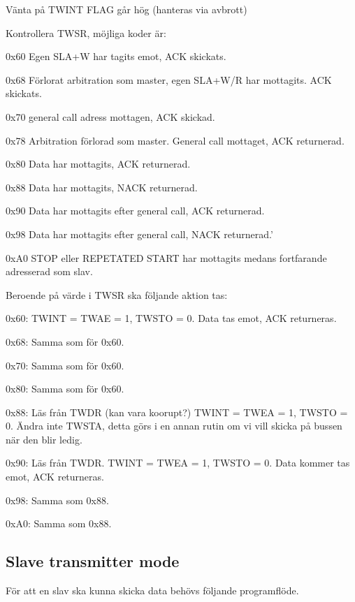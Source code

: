 \begin{packed_enumerate}
\item Vänta på TWINT FLAG går hög (hanteras via avbrott)
\item Kontrollera TWSR, möjliga koder är:
\begin{packed_enumerate}
\item 0x60 Egen SLA+W har tagits emot, ACK skickats.
\item 0x68 Förlorat arbitration som master, egen SLA+W/R har mottagits. ACK skickats.
\item 0x70 general call adress mottagen, ACK skickad.
\item 0x78 Arbitration förlorad som master. General call mottaget, ACK returnerad.
\item 0x80 Data har mottagits, ACK returnerad.
\item 0x88 Data har mottagits, NACK returnerad.
\item 0x90 Data har mottagits efter general call, ACK returnerad.
\item 0x98 Data har mottagits efter general call, NACK returnerad.’
\item 0xA0 STOP eller REPETATED START har mottagits medans fortfarande adresserad som slav.
\end{packed_enumerate}
\item Beroende på värde i TWSR ska följande aktion tas:
\begin{packed_enumerate}
\item 0x60: TWINT = TWAE = 1, TWSTO = 0. Data tas emot, ACK returneras.
\item 0x68: Samma som för 0x60.
\item 0x70: Samma som för 0x60.
\item 0x80: Samma som för 0x60.
\item 0x88: Läs från TWDR (kan vara koorupt?) TWINT = TWEA = 1, TWSTO = 0. Ändra inte TWSTA, detta görs i en annan rutin om vi vill skicka på bussen när den blir ledig.
\item 0x90: Läs från TWDR. TWINT = TWEA = 1, TWSTO = 0. Data kommer tas emot, ACK returneras.
\item 0x98: Samma som 0x88.
\item 0xA0: Samma som 0x88.
\end{packed_enumerate}
\end{packed_enumerate}

\subsection{Slave transmitter mode}
För att en slav ska kunna skicka data behövs följande programflöde.

